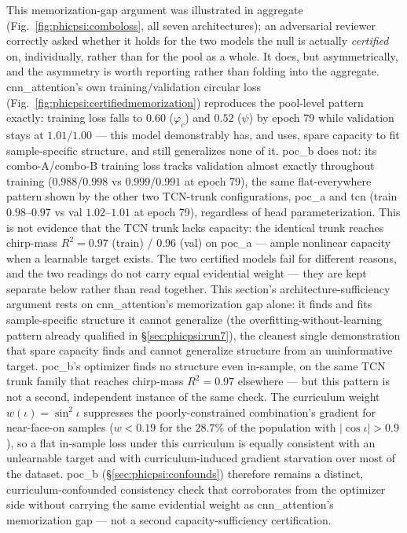\documentclass[11pt]{article}
\begin{document}
This memorization-gap argument was illustrated in aggregate (Fig.~\ref{fig:phicpsi:comboloss}, all seven architectures); an adversarial reviewer correctly asked whether it holds for the two models the null is actually \emph{certified} on, individually, rather than for the pool as a whole.
It does, but asymmetrically, and the asymmetry is worth reporting rather than folding into the aggregate.
cnn\_attention's own training/validation circular loss (Fig.~\ref{fig:phicpsi:certifiedmemorization}) reproduces the pool-level pattern exactly: training loss falls to $0.60$ ($\varphi_c$) and $0.52$ ($\psi$) by epoch 79 while validation stays at $1.01$/$1.00$ --- this model demonstrably has, and uses, spare capacity to fit sample-specific structure, and still generalizes none of it.
poc\_b does not: its combo-A/combo-B training loss tracks validation almost exactly throughout training ($0.988$/$0.998$ vs $0.999$/$0.991$ at epoch 79), the same flat-everywhere pattern shown by the other two TCN-trunk configurations, poc\_a and tcn (train $0.98$--$0.97$ vs val $1.02$--$1.01$ at epoch 79), regardless of head parameterization.
This is not evidence that the TCN trunk lacks capacity: the identical trunk reaches chirp-mass $R^2 = 0.97$ (train) / $0.96$ (val) on poc\_a --- ample nonlinear capacity when a learnable target exists.
The two certified models fail for different reasons, and the two readings do not carry equal evidential weight --- they are kept separate below rather than read together.
This section's architecture-sufficiency argument rests on cnn\_attention's memorization gap alone: it finds and fits sample-specific structure it cannot generalize (the overfitting-without-learning pattern already qualified in \S\ref{sec:phicpsi:run7}), the cleanest single demonstration that spare capacity finds and cannot generalize structure from an uninformative target.
poc\_b's optimizer finds no structure even in-sample, on the same TCN trunk family that reaches chirp-mass $R^2 = 0.97$ elsewhere --- but this pattern is not a second, independent instance of the same check.
The curriculum weight $w(\iota) = \sin^2\iota$ suppresses the poorly-constrained combination's gradient for near-face-on samples ($w < 0.19$ for the $28.7\%$ of the population with $|\cos\iota| > 0.9$), so a flat in-sample loss under this curriculum is equally consistent with an unlearnable target and with curriculum-induced gradient starvation over most of the dataset.
poc\_b (\S\ref{sec:phicpsi:confounds}) therefore remains a distinct, curriculum-confounded consistency check that corroborates from the optimizer side without carrying the same evidential weight as cnn\_attention's memorization gap --- not a second capacity-sufficiency certification.
\end{document}

